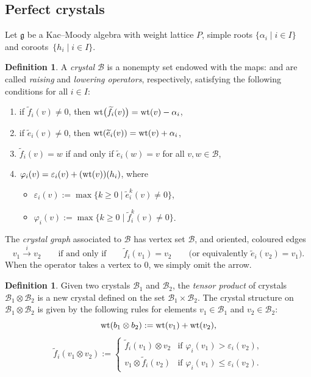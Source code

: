 \documentclass[pdftex]{sigma}
\numberwithin{equation}{section}
\theoremstyle{definition}
\newtheorem{Definition}[Theorem]{Definition}
\begin{document}
\subsection{Perfect crystals}
Let $\mathfrak{g}$ be a Kac--Moody algebra with weight lattice $P$, simple roots $\{\alpha_i\mid i\in I\}$ and coroots~${\{h_i \mid i\in I\}}$.
\begin{Definition}%
A \emph{crystal} $ \mathcal{B} $ is a nonempty set endowed with the maps:  and  are called \emph{raising} and \emph{lowering operators}, respectively, satisfying the following conditions for all $ i\in I $:
\begin{enumerate}[label=(\roman*)]\itemsep=0pt
 \item if $ \tilde{f}_i(v) \neq 0 $, then $ {\rm wt}\bigl(\widetilde{f}_i(v)\bigr) = {\rm wt}(v) - \alpha_i $,
 \item if $ \tilde{e}_i(v) \neq 0 $, then $ {\rm wt} (\widetilde{e}_i(v) ) = {\rm wt}(v) + \alpha_i $,
 \item $\tilde{f}_i(v)=w$ if and only if $\tilde{e}_i(w)=v$ for all $v,w\in \mathcal{B}$,
 \item $ \varphi_i(v) = \varepsilon_i(v) + ({\rm wt}(v) ) (h_i )$, where
 \begin{itemize}\itemsep=0pt
 \item $ \varepsilon_i(v) := \max \bigl\{ k \geq 0 \mid \tilde{e}_i^k(v) \neq 0 \bigr\} $,
 \item $ \varphi_i(v) := \max \bigl\{ k \geq 0 \mid \tilde{f}_i^k(v) \neq 0 \bigr\} $.
 \end{itemize}
\end{enumerate}
\end{Definition}

The \emph{crystal graph} associated to $\mathcal{B}$ has vertex set $\mathcal{B}$, and oriented, coloured edges
\[
v_1 \overset{i}{\longrightarrow} v_2 \qquad \text{if and only if} \qquad \tilde{f}_i(v_1) = v_2 \qquad \text{(or equivalently } \tilde{e}_i(v_2) = v_1).
\]
When the operator  takes a vertex to $0$, we simply omit the arrow.

\begin{Definition}\label{def:crystaltensor}
Given two crystals $ \mathcal{B}_1 $ and $ \mathcal{B}_2 $, the \emph{tensor product} of crystals $ \mathcal{B}_1 \otimes \mathcal{B}_2 $ is a new crystal defined on the set $ \mathcal{B}_1 \times \mathcal{B}_2 $. The crystal structure on $ \mathcal{B}_1 \otimes \mathcal{B}_2 $ is given by the following rules for elements $ v_1 \in \mathcal{B}_1 $ and $ v_2 \in \mathcal{B}_2 $:
\[
{\rm wt}(b_1 \otimes b_2) := {\rm wt}(v_1) + {\rm wt}(v_2),
\]
\[
\tilde{f}_i(v_1 \otimes v_2) :=
\begin{cases}
\tilde{f}_i(v_1) \otimes v_2 & \text{if } \varphi_i(v_1) > \varepsilon_i(v_2), \\
v_1 \otimes \tilde{f}_i(v_2) & \text{if } \varphi_i(v_1) \leq \varepsilon_i(v_2).
\end{cases}
\]
\end{Definition}
\end{document}
